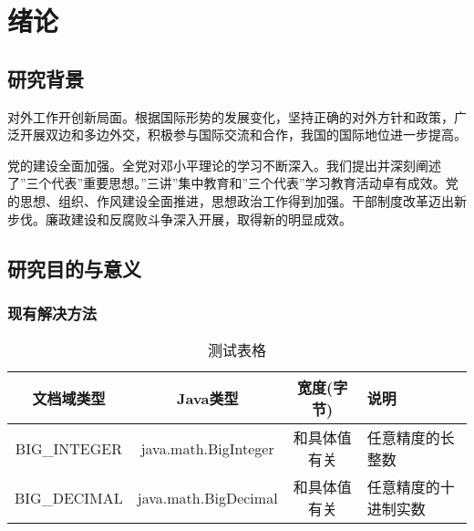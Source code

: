 \documentclass[adobefonts]{njuthesis}
\begin{document}
\tableofcontents

\listoffigures

\listoftables

\mainmatter

\chapter{绪论}\label{chapter_introduction}
\section{研究背景}

对外工作开创新局面。根据国际形势的发展变化，坚持正确的对外方针和政策，广泛开展双边和多边外交，积极参与国际交流和合作，我国的国际地位进一步提高。 

党的建设全面加强。全党对邓小平理论的学习不断深入。我们提出并深刻阐述了”三个代表”重要思想。”三讲”集中教育和”三个代表”学习教育活动卓有成效。党的思想、组织、作风建设全面推进，思想政治工作得到加强。干部制度改革迈出新步伐。廉政建设和反腐败斗争深入开展，取得新的明显成效。


\section{研究目的与意义}
\subsection{现有解决方法}
\begin{table}[htbp]
  \centering
  \begin{tabular}{cccp{38mm}}
    \toprule
    \textbf{文档域类型} & \textbf{Java类型} & \textbf{宽度(字节)} & \textbf{说明} \\
    \midrule
    BIG\_INTEGER & java.math.BigInteger & 和具体值有关 & 任意精度的长整数 \\
    BIG\_DECIMAL & java.math.BigDecimal & 和具体值有关 & 任意精度的十进制实数 \\
    \bottomrule
  \end{tabular}
  \caption{测试表格}\label{table:test1}
\end{table}
\end{document}
